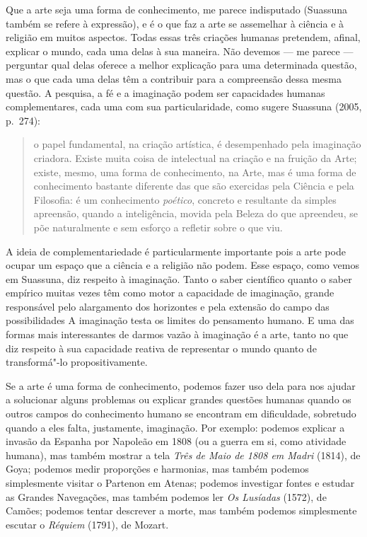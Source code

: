 Que a arte seja uma forma de conhecimento, me parece indisputado
(Suassuna também se refere à expressão), e é o que faz a arte se
assemelhar à ciência e à religião em muitos aspectos. Todas essas três
criações humanas pretendem, afinal, explicar o mundo, cada uma delas à
sua maneira. Não devemos --- me parece --- perguntar qual delas oferece a
melhor explicação para uma determinada questão, mas o que cada uma delas
têm a contribuir para a compreensão dessa mesma questão. A pesquisa, a
fé e a imaginação podem ser capacidades humanas complementares, cada uma
com sua particularidade, como sugere Suassuna (2005, p.~274):

\begin{quote}
o papel fundamental, na criação artística, é desempenhado pela
imaginação criadora. Existe muita coisa de intelectual na criação e na
fruição da Arte; existe, mesmo, uma forma de conhecimento, na Arte, mas
é uma forma de conhecimento bastante diferente das que são exercidas
pela Ciência e pela Filosofia: é um conhecimento \emph{poético},
concreto e resultante da simples apreensão, quando a inteligência,
movida pela Beleza do que apreendeu, se põe naturalmente e sem esforço a
refletir sobre o que viu.
\end{quote}

A ideia de complementariedade é particularmente importante pois a arte
pode ocupar um espaço que a ciência e a religião não podem. Esse espaço,
como vemos em Suassuna, diz respeito à imaginação. Tanto o saber
científico quanto o saber empírico muitas vezes têm como motor a
capacidade de imaginação, grande responsável pelo alargamento dos
horizontes e pela extensão do campo das possibilidades A imaginação
testa os limites do pensamento humano. E uma das formas mais
interessantes de darmos vazão à imaginação é a arte, tanto no que diz
respeito à sua capacidade reativa de representar o mundo quanto de
transformá"-lo propositivamente.

Se a arte é uma forma de conhecimento, podemos fazer uso dela para nos
ajudar a solucionar alguns problemas ou explicar grandes questões
humanas quando os outros campos do conhecimento humano se encontram em
dificuldade, sobretudo quando a eles falta, justamente, imaginação. Por
exemplo: podemos explicar a invasão da Espanha por Napoleão em 1808 (ou
a guerra em si, como atividade humana), mas também mostrar a tela
\emph{Três de Maio de 1808 em Madri} (1814), de Goya; podemos medir
proporções e harmonias, mas também podemos simplesmente visitar o
Partenon em Atenas; podemos investigar fontes e estudar as Grandes
Navegações, mas também podemos ler \emph{Os Lusíadas} (1572), de Camões;
podemos tentar descrever a morte, mas também podemos simplesmente
escutar o \emph{Réquiem} (1791), de Mozart.

